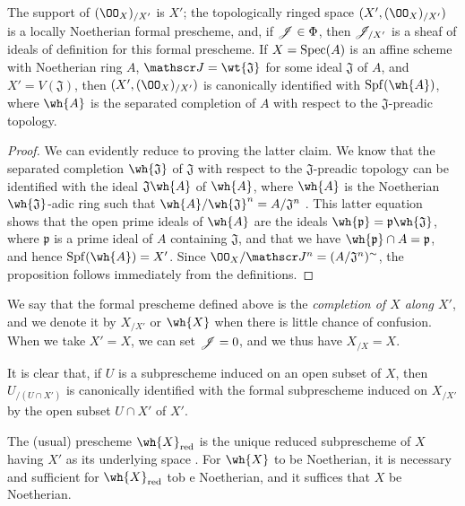 \begin{prop}[10.8.5]
\label{1.10.8.5}
The support of $(\OO_X)_{/X'}$ is $X'$; the topologically ringed space $(X',(\OO_X)_{/X'})$ is a locally Noetherian formal prescheme, and, if $\mathscr{J}\in\Phi$, then $\mathscr{J}_{/X'}$ is a sheaf of ideals of definition for this formal prescheme.
If $X=\operatorname{Spec}(A)$ is an affine scheme with Noetherian ring $A$, $\sh{J}=\wt{\mathfrak{J}}$ for some ideal $\mathfrak{J}$ of $A$, and $X'=V(\mathfrak{J})$, then $(X',(\OO_X)_{/X'})$ is canonically identified with $\Spf(\wh{A})$, where $\wh{A}$ is the separated completion of $A$ with respect to the $\mathfrak{J}$-preadic topology.
\end{prop}

\begin{proof}
\label{proof-1.10.8.5}
We can evidently reduce to proving the latter claim.
We know  that the separated completion $\wh{\mathfrak{J}}$ of $\mathfrak{J}$ with respect to the $\mathfrak{J}$-preadic topology can be identified with the ideal $\mathfrak{J}\wh{A}$ of $\wh{A}$, where $\wh{A}$ is the Noetherian $\wh{\mathfrak{J}}$-adic ring such that $\wh{A}/\wh{\mathfrak{J}}^n=A/\mathfrak{J}^n$ .
This latter equation shows that the open prime ideals of $\wh{A}$ are the ideals $\wh{\mathfrak{p}}=\mathfrak{p}\wh{\mathfrak{J}}$, where $\mathfrak{p}$ is a prime ideal of $A$ containing $\mathfrak{J}$, and that we have $\wh{\mathfrak{p}}\cap A=\mathfrak{p}$, and hence $\Spf(\wh{A})=X'$.
Since $\OO_X/\sh{J}^n=(A/\mathfrak{J}^n)^\sim$, the proposition follows immediately from the definitions.
\end{proof}

We say that the formal prescheme defined above is the \emph{completion of $X$ along $X'$}, and we denote it by $X_{/X'}$ or $\wh{X}$ when there is little chance of confusion.
When we take $X'=X$, we can set $\mathscr{J}=0$, and we thus have $X_{/X}=X$.

It is clear that, if $U$ is a subprescheme induced on an open subset of $X$, then $U_{/(U\cap X')}$ is canonically identified with the formal subprescheme induced on $X_{/X'}$ by the open subset $U\cap X'$ of $X'$.

\begin{cor}[10.8.6]
\label{1.10.8.6}
The (usual) prescheme $\wh{X}_\red$ is the unique reduced subprescheme of $X$ having $X'$ as its underlying space .
For $\wh{X}$ to be Noetherian, it is necessary and sufficient for $\wh{X}_\red$ tob e Noetherian, and it suffices that $X$ be Noetherian.
\end{cor}

